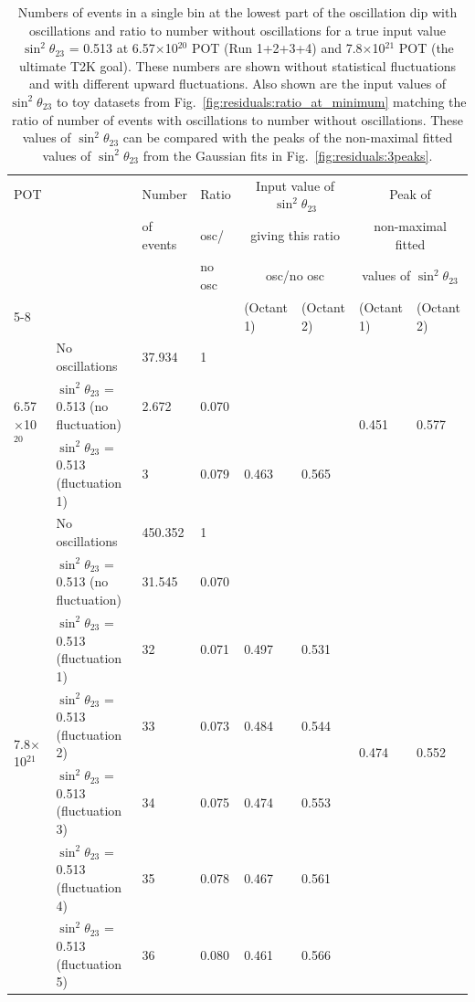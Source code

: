 \begin{table}[htbp]
\center
\begin{tabular}{|p{1.5cm}|p{2.5cm}|p{1.5cm}|p{1cm}|p{1.6cm}|p{1.6cm}|p{1.6cm}|p{1.6cm}|}
\hline
POT &   & Number  & Ratio &  \multicolumn{2}{c|}{Input value of $\sin^{2}\theta_{23}$} & \multicolumn{2}{c|}{Peak of} \\
& & of events & osc/        & \multicolumn{2}{c|}{giving this ratio}   & \multicolumn{2}{c|}{non-maximal fitted} \\
  & &  & no osc        &   \multicolumn{2}{c|}{osc/no osc}  & \multicolumn{2}{c|}{values of $\sin^{2}\theta_{23}$} \\
\cline{5-8}
   & &  &         & (Octant 1) & (Octant 2) & (Octant 1) & (Octant 2) \\
\hline \hline
\multirow{3}{*}{6.57$\times$10$^{20}$} & No oscillations  & 37.934 & 1 & & & \multirow{3}{*}{0.451} & \multirow{3}{*}{0.577} \\
\cline{2-6}
 & $\sin^{2}\theta_{23}$ = 0.513 (no fluctuation) & 2.672 & 0.070 & & & & \\
\cline{2-6}
 & $\sin^{2}\theta_{23}$ = 0.513 (fluctuation 1) & 3 & 0.079 & 0.463 & 0.565 & & \\
\hline \hline
\multirow{7}{*}{7.8$\times$10$^{21}$} & No oscillations & 450.352 & 1 & & & \multirow{7}{*}{0.474} & \multirow{7}{*}{0.552} \\
\cline{2-6}
 & $\sin^{2}\theta_{23}$ = 0.513 (no fluctuation) & 31.545 & 0.070 & & & & \\
\cline{2-6}
 & $\sin^{2}\theta_{23}$ = 0.513 (fluctuation 1)  & 32 & 0.071 & 0.497 & 0.531 &  &  \\
\cline{2-6}
 & $\sin^{2}\theta_{23}$ = 0.513 (fluctuation 2)  & 33 & 0.073 & 0.484 & 0.544 &  &  \\
\cline{2-6}
 &$\sin^{2}\theta_{23}$ = 0.513 (fluctuation 3) & 34 & 0.075 & 0.474 & 0.553 &  &  \\
\cline{2-6}
 &$\sin^{2}\theta_{23}$ = 0.513 (fluctuation 4) & 35 & 0.078 & 0.467 & 0.561 &  & \\
\cline{2-6}
 &$\sin^{2}\theta_{23}$ = 0.513 (fluctuation 5) & 36 & 0.080 & 0.461 & 0.566 &  & \\
\hline
\end{tabular}
\caption{
Numbers of events in a single bin at the lowest part of the oscillation dip with oscillations and ratio to number without oscillations for a true input 
value $\sin^{2}\theta_{23}$ = 0.513 at 6.57$\times$10$^{20}$ POT (Run 1+2+3+4) and 7.8$\times$10$^{21}$ POT (the ultimate T2K goal). These numbers are 
shown without statistical fluctuations and with different upward fluctuations. Also shown are the input values of $\sin^{2}\theta_{23}$ to toy datasets 
from Fig.\ \ref{fig:residuals:ratio_at_minimum} matching the ratio of number of events with oscillations to number without oscillations. These values of 
$\sin^{2}\theta_{23}$ can be compared with the peaks of the non-maximal fitted values of $\sin^{2}\theta_{23}$ from the Gaussian fits in Fig.\ 
\ref{fig:residuals:3peaks}.}
\label{tab:residuals:3peaks}
\end{table}

